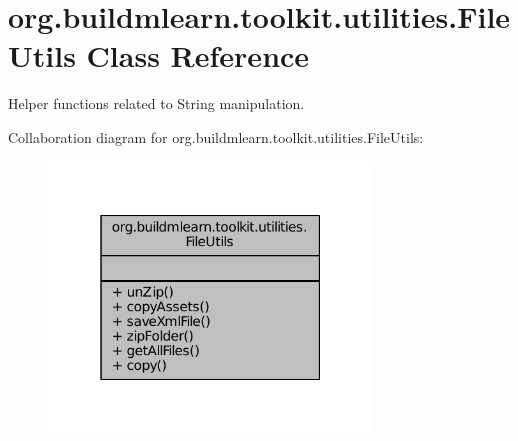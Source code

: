 \hypertarget{classorg_1_1buildmlearn_1_1toolkit_1_1utilities_1_1FileUtils}{\section{org.\-buildmlearn.\-toolkit.\-utilities.\-File\-Utils Class Reference}
\label{classorg_1_1buildmlearn_1_1toolkit_1_1utilities_1_1FileUtils}
}


Helper functions related to String manipulation.  




Collaboration diagram for org.\-buildmlearn.\-toolkit.\-utilities.\-File\-Utils\-:
\nopagebreak
\begin{figure}[H]
\begin{center}
\leavevmode
\includegraphics[width=244pt]{d4/d37/classorg_1_1buildmlearn_1_1toolkit_1_1utilities_1_1FileUtils__coll__graph}
\end{center}
\end{figure}
